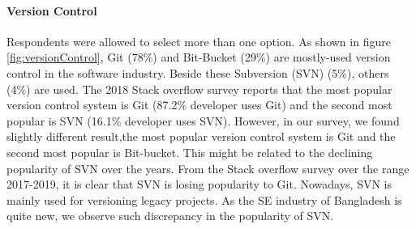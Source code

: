 \paragraph{Version Control}
Respondents were allowed to select more than one option. As shown in figure \ref{fig:versionControl}, Git (78\%) and Bit-Bucket (29\%) are mostly-used version control in the software industry. Beside these Subversion (SVN) (5\%), others (4\%) are used.  The 2018 Stack overflow survey\cite{StackoverflowSurvey2018} reports that  the most popular version control system is Git (87.2\% developer uses Git) and the second most popular is SVN (16.1\% developer uses SVN). However, in our survey, we found slightly different result,the most popular version control system is Git and the second most popular is Bit-bucket. This might be related to the declining popularity of SVN over the years. From the Stack overflow survey over the range 2017-2019, it is clear that SVN is losing popularity to Git. Nowadays, SVN is mainly used for versioning legacy projects. As the SE industry of Bangladesh is quite new, we observe such discrepancy in the popularity of SVN.

